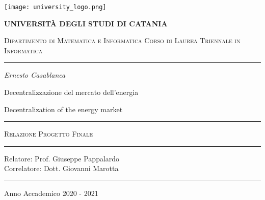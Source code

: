\begin{titlepage}
    \centering
    \texttt{[image: university\_logo.png]}

    \bigskip

    {\Large \textbf{UNIVERSIT\`A DEGLI STUDI DI CATANIA}}

    {\scshape
        \large
        Dipartimento di Matematica e Informatica
    }
    {\scshape
        \normalsize
        Corso di Laurea Triennale in Informatica
    }

    \bigskip

    \hrule

    \bigskip
    \bigskip
    \bigskip
    \bigskip

    {\itshape
        \large
        Ernesto Casablanca
        \par}

    \bigskip
    \bigskip
    \bigskip
    \bigskip

    {\centering
        \Large
        Decentralizzazione del mercato dell'energia
        \par}
    {\centering
        Decentralization of the energy market
        \par}

    \bigskip
    \bigskip
    \bigskip
    \bigskip
    \bigskip
    \bigskip

    \begin{minipage}[b]{8 cm}
        \hrule
        \bigskip
        {\centering\scshape
            Relazione Progetto Finale
            \par}
        \bigskip
        \hrule
    \end{minipage}

    \bigskip
    \bigskip
    \bigskip
    \bigskip
    \bigskip
    \bigskip
    \bigskip
    \bigskip
    \bigskip
    \bigskip
    \bigskip

    {\raggedleft
        Relatore: Prof. Giuseppe Pappalardo \\
        Correlatore: Dott. Giovanni Marotta
        \par}

    \bigskip
    \bigskip
    \bigskip
    \bigskip

    \hrule

    \bigskip

    {\centering
        Anno Accademico 2020 - 2021
        \par}

\end{titlepage}
